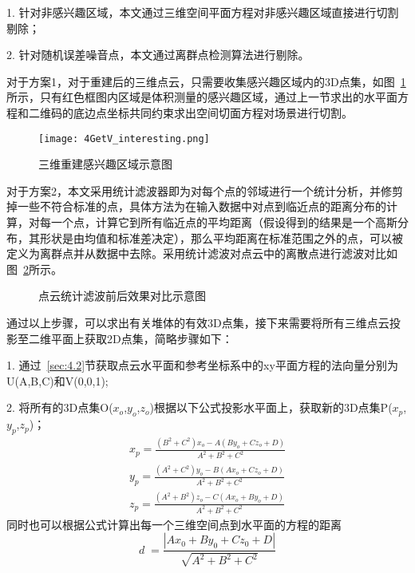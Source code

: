 1. 针对非感兴趣区域，本文通过三维空间平面方程对非感兴趣区域直接进行切割剔除；

2. 针对随机误差噪音点，本文通过离群点检测算法进行剔除。

对于方案1，对于重建后的三维点云，只需要收集感兴趣区域内的3D点集，如图~\ref{fig:4GetV_interesting}所示，只有红色框图内区域是体积测量的感兴趣区域，通过上一节求出的水平面方程和二维码的底边点坐标共同约束求出空间切面方程对场景进行切割。
\begin{figure}[H] %
  \centering
  \texttt{[image: 4GetV\_interesting.png]}
  \caption{三维重建感兴趣区域示意图}
  \label{fig:4GetV_interesting}
\end{figure}
对于方案2，本文采用统计滤波器即为对每个点的邻域进行一个统计分析，并修剪掉一些不符合标准的点，具体方法为在输入数据中对点到临近点的距离分布的计算，对每一个点，计算它到所有临近点的平均距离（假设得到的结果是一个高斯分布，其形状是由均值和标准差决定），那么平均距离在标准范围之外的点，可以被定义为离群点并从数据中去除。采用统计滤波对点云中的离散点进行滤波对比如图~\ref{fig:4GetV_filter}所示。
\begin{figure}[H]
  \centering
  \vskip0.5cm
  \caption{点云统计滤波前后效果对比示意图}\label{fig:4GetV_filter}
\end{figure}
通过以上步骤，可以求出有关堆体的有效3D点集，接下来需要将所有三维点云投影至二维平面上获取2D点集，简略步骤如下：

1. 通过~\ref{sec:4.2}节获取点云水平面和参考坐标系中的xy平面方程的法向量分别为U(A,B,C)和V(0,0,1);

2. 将所有的3D点集O($x_o$,$y_o$,$z_o$)根据以下公式投影水平面上，获取新的3D点集P($x_p$,$y_p$,$z_p$)；
\begin{equation}
  \begin{split}
  x_p=\frac{(B^2+C^2)x_o-A(By_o+Cz_o+D)}{A^2+B^2+C^2}\\
  y_p=\frac{(A^2+C^2)y_o-B(Ax_o+Cz_o+D)}{A^2+B^2+C^2}\\
  z_p=\frac{(A^2+B^2)z_o-C(Ax_o+By_o+D)}{A^2+B^2+C^2}
  \label{equ:pxyz}
  \end{split}
\end{equation}
同时也可以根据公式计算出每一个三维空间点到水平面的方程的距离
\begin{equation}
d\;=\frac{\left|Ax_0+By_0+Cz_0+D\right|}{\sqrt{A^2+B^2+C^2}}
\end{equation}

